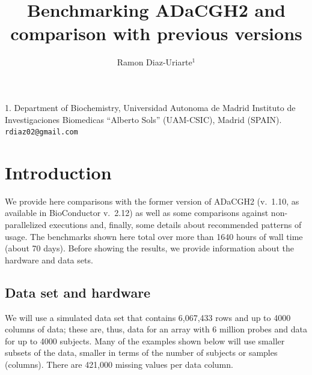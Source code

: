 \documentclass[a4paper,11pt]{article}
\title{Benchmarking ADaCGH2 and comparison with previous versions}
\author{Ramon Diaz-Uriarte$^{1}$}
\begin{document}
\maketitle

\begin{center}
1. Department of Biochemistry,
Universidad Autonoma de Madrid
Instituto de Investigaciones Biomedicas ``Alberto Sols'' (UAM-CSIC), Madrid
(SPAIN).
{\tt rdiaz02@gmail.com}
\end{center}

\tableofcontents
\listoftables
\listoffigures



\clearpage

\section{Introduction}
We provide here comparisons with the former version of ADaCGH2 (v.\ 1.10,
as available in BioConductor v.\ 2.12) as well as some comparisons against
non-parallelized executions and, finally, some details about recommended
patterns of usage. The benchmarks shown here total over more than 1640 hours
of wall time (about 70 days).
Before showing the results, we provide information
about the hardware and data sets.



\subsection{Data set and hardware}
\label{sec:data-set-hardware}

We will use a simulated data set that contains 6,067,433 rows and up to
4000 columns of data; these are, thus, data for an array with 6 million
probes and data for up to 4000 subjects. Many of the examples shown below
will use smaller subsets of the data, smaller in terms of the number of
subjects or samples (columns). There are 421,000 missing values per data
column. 
\end{document}
